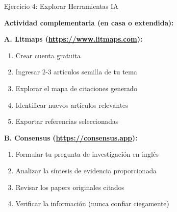 \documentclass[11pt,aspectratio=169]{beamer}
\begin{document}
\begin{frame}{Ejercicio 4: Explorar Herramientas IA}

	\textbf{Actividad complementaria (en casa o extendida):}



	\textbf{A. Litmaps (\url{https://www.litmaps.com}):}
	\begin{enumerate}
		\item Crear cuenta gratuita
		\item Ingresar 2-3 artículos semilla de tu tema
		\item Explorar el mapa de citaciones generado
		\item Identificar nuevos artículos relevantes
		\item Exportar referencias seleccionadas
	\end{enumerate}

	\vspace{0.3cm}

	\textbf{B. Consensus (\url{https://consensus.app}):}
	\begin{enumerate}
		\item Formular tu pregunta de investigación en inglés
		\item Analizar la síntesis de evidencia proporcionada
		\item Revisar los papers originales citados
		\item Verificar la información (nunca confiar ciegamente)
	\end{enumerate}
\end{frame}

\end{document}

